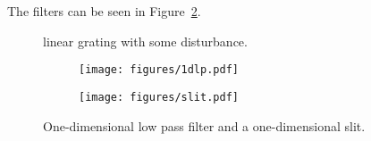 \documentclass[12pt,a4paper]{article}
\begin{document}
The filters can be seen in Figure~\ref{fig:filters2}.
\begin{figure}[h]
  \centering
  \noindent\makebox[\textwidth]{\scalebox{0.90}{}}
  \caption{linear grating with some disturbance.}
  \label{fig:disturbance}
\end{figure}
\begin{figure}[h]
  \centering
  \begin{subfigure}[b]{0.45\textwidth}
    \texttt{[image: figures/1dlp.pdf]}
  \end{subfigure}
  \begin{subfigure}[b]{0.45\textwidth}
    \texttt{[image: figures/slit.pdf]}
  \end{subfigure}
  \caption{One-dimensional low pass filter and a one-dimensional slit.}
  \label{fig:filters2}
\end{figure}
\end{document}
